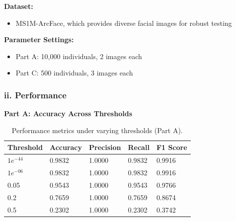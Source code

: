 \documentclass[12pt,a4paper]{article}
\begin{document}
\textbf{Dataset:}
\begin{itemize}
    \item MS1M-ArcFace, which provides diverse facial images for robust testing
\end{itemize}

\textbf{Parameter Settings:}
\begin{itemize}
    \item Part A: 10,000 individuals, 2 images each
    \item Part C: 500 individuals, 3 images each
\end{itemize}

\subsubsection*{ii. Performance}

\textbf{Part A: Accuracy Across Thresholds}

\begin{table}[H]
\centering
\begin{tabular}{|l|l|l|l|l|}
\hline
\textbf{Threshold} & \textbf{Accuracy} & \textbf{Precision} & \textbf{Recall} & \textbf{F1 Score} \\ \hline
\(1e^{-44}\)       & 0.9832            & 1.0000             & 0.9832          & 0.9916            \\ \hline
\(1e^{-06}\)       & 0.9832            & 1.0000             & 0.9832          & 0.9916            \\ \hline
0.05               & 0.9543            & 1.0000             & 0.9543          & 0.9766            \\ \hline
0.2                & 0.7659            & 1.0000             & 0.7659          & 0.8674            \\ \hline
0.5                & 0.2302            & 1.0000             & 0.2302          & 0.3742            \\ \hline
\end{tabular}
\caption{Performance metrics under varying thresholds (Part A).}
\label{tab:partA_thresholds}
\end{table}
\end{document}
